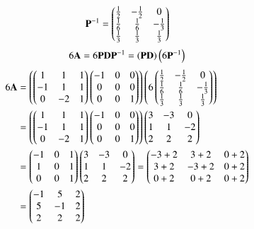 \documentclass[journal]{IEEEtran}
\begin{document}
 \begin{align}
    \mathbf{P}^{-1}=\begin{pmatrix}\frac{1}{2} & -\frac{1}{2} & 0 \\\frac{1}{6} & \frac{1}{6} & -\frac{1}{3}\\ \frac{1}{3} & \frac{1}{3} & \frac{1}{3}\end{pmatrix}
 \end{align}
 \begin{align}
6\mathbf{A}=6\mathbf{P}\mathbf{D}\mathbf{P}^{-1}=\left(\mathbf{P}\mathbf{D}\right)\left(6\mathbf{P}^{-1}\right) 
\end{align}
\begin{align}
6\mathbf{A}&=\left(\begin{pmatrix}1&1&1\\-1&1&1\\0&-2&1\end{pmatrix}\begin{pmatrix}-1&0&0\\0&0&0\\0&0&1\end{pmatrix}\right)\left(6\begin{pmatrix}\frac{1}{2} & -\frac{1}{2} & 0 \\\frac{1}{6} & \frac{1}{6} & -\frac{1}{3}\\ \frac{1}{3} & \frac{1}{3} & \frac{1}{3}\end{pmatrix}\right)\\
&=\left(\begin{pmatrix}1&1&1\\-1&1&1\\0&-2&1\end{pmatrix}\begin{pmatrix}-1&0&0\\0&0&0\\0&0&1\end{pmatrix} \right)\begin{pmatrix}3 & -3 & 0 \\1 & 1 & -2\\ 2 & 2 & 2\end{pmatrix}\\
&=\begin{pmatrix}-1 & 0 & 1 \\ 1& 0 & 1 \\0 & 0 & 1\end{pmatrix}\begin{pmatrix}3 & -3 & 0 \\1 & 1 & -2\\ 2 & 2 & 2\end{pmatrix}
=\begin{pmatrix}-3+2& 3+2&0+2\\3+2&-3+2&0+2\\0+2&0+2&0+2\end{pmatrix} \\
&=\begin{pmatrix}-1&5&2\\5&-1&2\\2&2&2\end{pmatrix}
\end{align}
\end{document}
